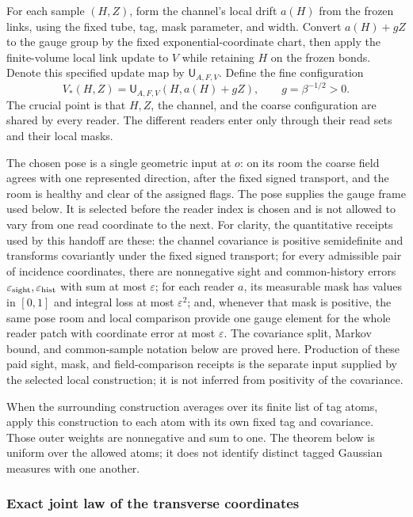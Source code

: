 For each sample $(H,Z)$, form the channel's local drift $a(H)$ from the
frozen links, using the fixed tube, tag, mask parameter, and width. Convert
$a(H)+gZ$ to the gauge group by the fixed
exponential-coordinate chart, then apply the finite-volume local link
update to $V$ while retaining $H$ on the frozen bonds. Denote this
specified update map by $\mathsf U_{A,F,V}$. Define the fine configuration
\begin{equation}\label{eq:ex-lattice-reader-fine-field}
 V_*(H,Z)=\mathsf U_{A,F,V}\!\left(H,a(H)+gZ\right),
 \qquad g=\beta^{-1/2}>0.
\end{equation}
The crucial point is that $H,Z$, the channel, and the coarse configuration
are shared by every reader. The different readers enter only through their
read sets and their local masks.

The chosen pose is a single geometric input at $o$: on its room the coarse
field agrees with one represented direction, after the fixed signed
transport, and the room is healthy and clear of the assigned flags. The
pose supplies the gauge frame used below. It is selected before the reader
index is chosen and is not allowed to vary from one read coordinate to the
next. For clarity, the quantitative receipts used by this handoff are these:
the channel covariance is positive semidefinite and transforms covariantly
under the fixed signed transport; for every admissible pair of incidence
coordinates, there are nonnegative sight and common-history errors
$\varepsilon_{\rm sight},\varepsilon_{\rm hist}$ with sum at most
$\varepsilon$; for each reader $a$, its measurable mask has values in
$[0,1]$ and integral loss at most $\varepsilon^2$; and, whenever that mask
is positive, the same pose room and local comparison provide one gauge
element for the whole reader patch with coordinate error at most
$\varepsilon$. The covariance split, Markov bound, and common-sample
notation below are proved here. Production of these paid sight, mask, and
field-comparison receipts is the separate input supplied by the selected
local construction; it is not inferred from positivity of the covariance.

When the surrounding construction averages over its finite list of tag
atoms, apply this construction to each atom with its own fixed tag and
covariance. Those outer weights are nonnegative and sum to one. The theorem
below is uniform over the allowed atoms; it does not identify distinct
tagged Gaussian measures with one another.

\subsubsection{Exact joint law of the transverse coordinates}

